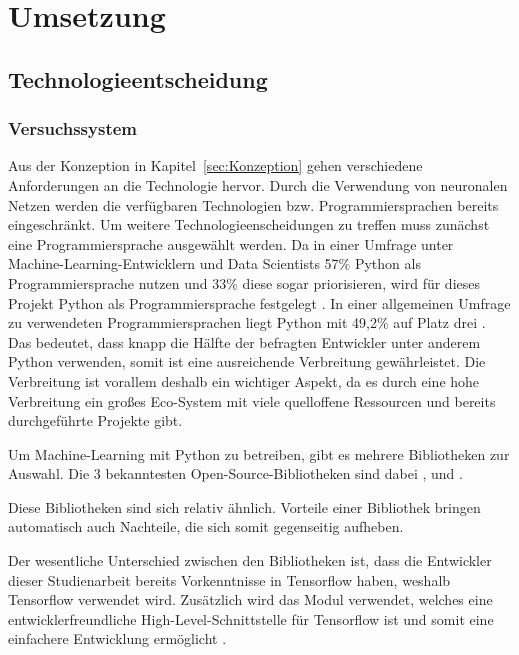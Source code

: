 \section{Umsetzung}

\subsection{Technologieentscheidung}
\subsubsection{Versuchssystem}
Aus der Konzeption in Kapitel~\ref{sec:Konzeption} gehen verschiedene Anforderungen an die Technologie hervor.
Durch die Verwendung von neuronalen Netzen werden die verfügbaren Technologien bzw. Programmiersprachen bereits eingeschränkt.
Um weitere Technologieenscheidungen zu treffen muss zunächst eine Programmiersprache ausgewählt werden.
Da in einer Umfrage unter Machine-Learning-Entwicklern und Data Scientists 57\% Python als Programmiersprache nutzen und 33\% diese sogar priorisieren, wird für dieses Projekt Python als Programmiersprache festgelegt \autocite[vgl. ][S. 16]{vision_mobile_state_2017}.
In einer allgemeinen Umfrage zu verwendeten Programmiersprachen liegt Python mit 49,2\% auf Platz drei \autocite[vgl.][]{yepis_2023_2023}.
Das bedeutet, dass knapp die Hälfte der befragten Entwickler unter anderem Python verwenden, somit ist eine ausreichende Verbreitung gewährleistet.
Die Verbreitung ist vorallem deshalb ein wichtiger Aspekt, da es durch eine hohe Verbreitung ein großes Eco-System mit viele quelloffene Ressourcen und bereits durchgeführte Projekte gibt.

Um Machine-Learning mit Python zu betreiben, gibt es mehrere Bibliotheken zur Auswahl.
Die 3 bekanntesten Open-Source-Bibliotheken sind dabei ,  und  \autocite[vgl.][]{msv_tensorflow_nodate}.

Diese Bibliotheken sind sich relativ ähnlich.
Vorteile einer Bibliothek bringen automatisch auch Nachteile, die sich somit gegenseitig aufheben.

Der wesentliche Unterschied zwischen den Bibliotheken ist, dass die Entwickler dieser Studienarbeit bereits Vorkenntnisse in Tensorflow haben, weshalb Tensorflow verwendet wird.
Zusätzlich wird das Modul  verwendet, welches eine entwicklerfreundliche High-Level-Schnittstelle für Tensorflow ist und somit eine einfachere Entwicklung ermöglicht \autocite[vgl.][]{noauthor_keras_nodate}.


